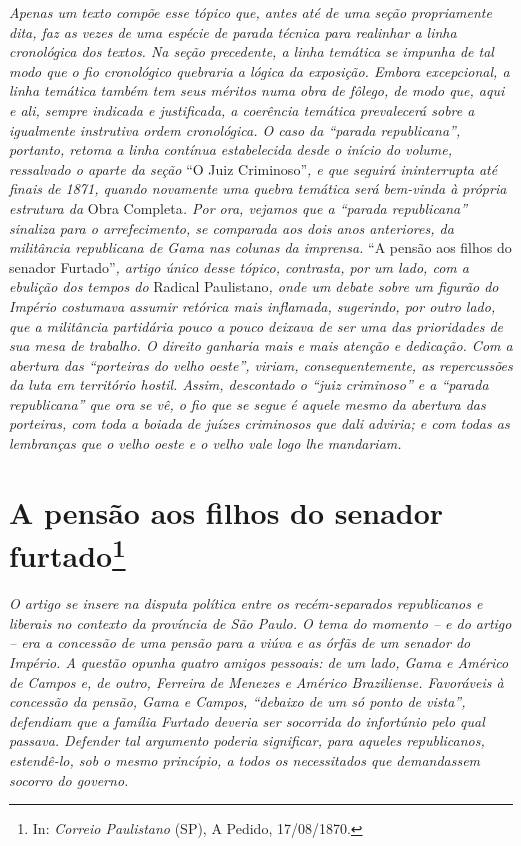 {\begin{didascalia}
\emph{Apenas um texto compõe esse tópico que, antes até de uma seção
propriamente dita, faz as vezes de uma espécie de parada técnica para
realinhar a linha cronológica dos textos. Na seção precedente, a linha
temática se impunha de tal modo que o fio cronológico quebraria a lógica
da exposição. Embora excepcional, a linha temática também tem seus
méritos numa obra de fôlego, de modo que, aqui e ali, sempre indicada e
justificada, a coerência temática prevalecerá sobre a igualmente
instrutiva ordem cronológica. O caso da ``parada republicana'', portanto,
retoma a linha contínua estabelecida desde o início do volume,
ressalvado o aparte da seção} ``O Juiz Criminoso''\emph{, e que seguirá
ininterrupta até finais de 1871, quando novamente uma quebra temática
será bem-vinda à própria estrutura da} Obra Completa\emph{. Por ora,
vejamos que a ``parada republicana'' sinaliza para o arrefecimento, se
comparada aos dois anos anteriores, da militância republicana de Gama
nas colunas da imprensa.} ``A pensão aos filhos do senador
Furtado''\emph{, artigo único desse tópico, contrasta, por um lado, com a
ebulição dos tempos do} Radical Paulistano\emph{, onde um debate sobre
um figurão do Império costumava assumir retórica mais inflamada,
sugerindo, por outro lado, que a militância partidária pouco a pouco
deixava de ser uma das prioridades de sua mesa de trabalho. O direito
ganharia mais e mais atenção e dedicação. Com a abertura das ``porteiras
do velho oeste'', viriam, consequentemente, as repercussões da luta em
território hostil. Assim, descontado o ``juiz criminoso'' e a ``parada
republicana'' que ora se vê, o fio que se segue é aquele mesmo da
abertura das porteiras, com toda a boiada de juízes criminosos que dali
adviria; e com todas as lembranças que o velho oeste e o velho vale logo
lhe mandariam.}
\end{didascalia}

\chapter{A pensão aos filhos do senador furtado\footnote{ In: \emph{Correio Paulistano} (SP), A Pedido, 17/08/1870.}}%

\begin{didascalia}
\emph{O artigo se insere na disputa política entre os recém-separados
republicanos e liberais no contexto da província de São Paulo. O tema do
momento -- e do artigo -- era a concessão de uma pensão para a viúva e
as órfãs de um senador do Império. A questão opunha quatro amigos
pessoais: de um lado, Gama e Américo de Campos e, de outro, Ferreira de
Menezes e Américo Braziliense. Favoráveis à concessão da pensão, Gama e
Campos, ``debaixo de um só ponto de vista'', defendiam que a família
Furtado deveria ser socorrida do infortúnio pelo qual passava. Defender
tal argumento poderia significar, para aqueles republicanos, estendê-lo,
sob o mesmo princípio, a todos os necessitados que demandassem socorro
do governo.}
\end{didascalia}

}
